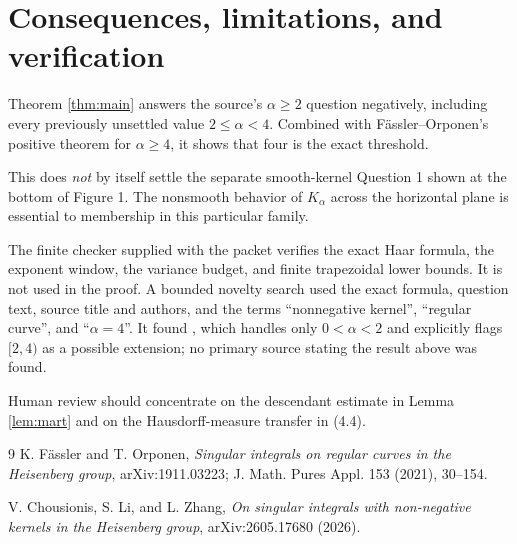 \documentclass[11pt]{article}
\begin{document}
\section{Consequences, limitations, and verification}

Theorem \ref{thm:main} answers the source's $\alpha\geq2$ question
negatively, including every previously unsettled value $2\leq\alpha<4$.
Combined with F\"assler--Orponen's positive theorem for $\alpha\geq4$, it
shows that four is the exact threshold.

This does \emph{not} by itself settle the separate smooth-kernel Question 1
shown at the bottom of Figure 1.  The nonsmooth behavior of $K_\alpha$ across
the horizontal plane is essential to membership in this particular family.

The finite checker supplied with the packet verifies the exact Haar formula,
the exponent window, the variance budget, and finite trapezoidal lower bounds.
It is not used in the proof.  A bounded novelty search used the exact formula,
question text, source title and authors, and the terms ``nonnegative kernel'',
``regular curve'', and ``$\alpha=4$''.  It found \cite{CLZ}, which handles
only $0<\alpha<2$ and explicitly flags $[2,4)$ as a possible extension; no
primary source stating the result above was found.

Human review should concentrate on the descendant estimate in Lemma
\ref{lem:mart} and on the Hausdorff-measure transfer in (4.4).

\begin{thebibliography}{9}
K. F\"assler and T. Orponen,
\emph{Singular integrals on regular curves in the Heisenberg group},
arXiv:1911.03223; J. Math. Pures Appl. 153 (2021), 30--154.

V. Chousionis, S. Li, and L. Zhang,
\emph{On singular integrals with non-negative kernels in the Heisenberg group},
arXiv:2605.17680 (2026).
\end{thebibliography}
\end{document}
